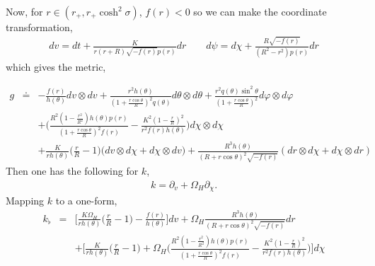 \documentclass[11pt]{article}
\renewcommand{\phi}{\varphi}
\begin{document}
 Now, for $r\in (r_+,r_+\cosh^2\sigma)$, $f(r)<0$ so we can make the coordinate transformation, 
\begin{eqnarray}
dv=dt+\frac{K}{r(r+R)\sqrt{-f(r)}p(r)}dr\qquad d\psi=d\chi+\frac{R\sqrt{-f(r)}}{(R^2-r^2)p(r)}dr
\end{eqnarray}
which gives the metric, 
\iffalse
\begin{eqnarray}
g=\begin{pmatrix}
 -\frac{f(r)}{h(\theta)}&0&0&0&\frac{K}{rh(\theta)}\Big(\frac{r}{R}-1\Big)\\
 0&0&0&0&\frac{R^3h(\theta)}{(R+r\cos\theta)^2\sqrt{-f(r)}}\\
 0&0&\frac{r^2h(\theta)}{(1+\frac{r\cos\theta}{R})^2q(\theta)}&0&0\\
 0&0&0&\frac{r^2q(\theta)\sin^2\theta}{(1+\frac{r\cos\theta}{R})^2}&0\\
\frac{K}{rh(\theta)}\Big(\frac{r}{R}-1\Big) &\frac{R^3h(\theta)}{(R+r\cos\theta)^2\sqrt{-f(r)}}&0&0&\frac{R^2(1-\frac{r^2}{R^2})h(\theta)p(r)}{(1+\frac{r\cos\theta}{R})^2f(r)}-\frac{K^2(1-\frac{r}{R})^2}{r^2f(r)h(\theta)}
 \end{pmatrix}
\end{eqnarray}
\fi
\begin{eqnarray}
 g&\doteq&-\frac{f(r)}{h(\theta)}dv\otimes dv+\frac{r^2h(\theta)}{(1+\frac{r\cos\theta}{R})^2q(\theta)}d\theta\otimes d\theta+\frac{r^2q(\theta)\sin^2\theta}{(1+\frac{r\cos\theta}{R})^2}d\phi\otimes d\phi\\
 &&+\Big(\frac{R^2(1-\frac{r^2}{R^2})h(\theta)p(r)}{(1+\frac{r\cos\theta}{R})^2f(r)}-\frac{K^2(1-\frac{r}{R})^2}{r^2f(r)h(\theta)}\Big)d\chi\otimes d\chi\nonumber\\
 &&+\frac{K}{rh(\theta)}\Big(\frac{r}{R}-1\Big)\big(dv\otimes d\chi+d\chi\otimes dv\big)+\frac{R^3h(\theta)}{(R+r\cos\theta)^2\sqrt{-f(r)}}(dr\otimes d\chi+d\chi\otimes dr)\nonumber
 \end{eqnarray}
Then one has the following for $k$, 
\begin{eqnarray}
k=\partial_v+\Omega_H\partial_{\chi}.
\end{eqnarray}
Mapping $k$ to a one-form, 
\begin{eqnarray}
k_{\flat}&=&\Big[\frac{K\Omega_H}{rh(\theta)}\Big(\frac{r}{R}-1\Big)-\frac{f(r)}{h(\theta)}\Big]dv+\Omega_H\frac{R^3h(\theta)}{(R+r\cos\theta)^2\sqrt{-f(r)}}dr\\
&&+\Big[\frac{K}{rh(\theta)}\Big(\frac{r}{R}-1\Big)+\Omega_H\Big(\frac{R^2(1-\frac{r^2}{R^2})h(\theta)p(r)}{(1+\frac{r\cos\theta}{R})^2f(r)}-\frac{K^2(1-\frac{r}{R})^2}{r^2f(r)h(\theta)}\Big)\Big]d\chi
\end{eqnarray}
\end{document}
